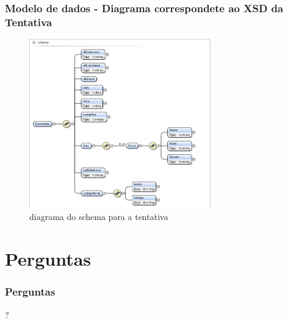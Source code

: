 \documentclass{beamer}
\begin{document}
\begin{frame}[fragile] \frametitle{Modelo de dados - Diagrama correspondete ao XSD da Tentativa}
\begin{figure}[htbp]
\begin{center}
\includegraphics[width=0.7\textwidth]{../report1/Images/tentativa_schema}
\caption{diagrama do schema para a tentativa}\label{fig xsd tentativa}
\end{center}
\end{figure}
\end{frame}

\section*{Perguntas}
\begin{frame} \frametitle{Perguntas}
\begin{center}\huge{?}\end{center}
\end{frame}
\end{document}
